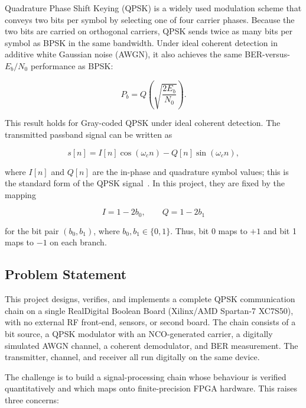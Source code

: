 \documentclass[10pt,twocolumn,letterpaper]{article}
\begin{document}
Quadrature Phase Shift Keying (QPSK) is a widely used modulation scheme that conveys two bits per symbol by selecting one of four carrier phases. Because the two bits are carried on orthogonal carriers, QPSK sends twice as many bits per symbol as BPSK in the same bandwidth. Under ideal coherent detection in additive white Gaussian noise (AWGN), it also achieves the same BER-versus-$E_b/N_0$ performance as BPSK:

\begin{equation}
P_b = Q\left(\sqrt{\frac{2E_b}{N_0}}\right).
\label{eq:qpsk_ber}
\end{equation}

This result holds for Gray-coded QPSK under ideal coherent detection. The transmitted passband signal can be written as

\begin{equation}
s[n] = I[n]\cos(\omega_c n) - Q[n]\sin(\omega_c n),
\label{eq:qpsk_signal}
\end{equation}

where $I[n]$ and $Q[n]$ are the in-phase and quadrature symbol values; this is the standard form of the QPSK signal~\cite{nptel_qpsk}. In this project, they are fixed by the mapping

\begin{equation}
I = 1 - 2b_0, \qquad Q = 1 - 2b_1
\label{eq:qpsk_mapping}
\end{equation}

for the bit pair $(b_0,b_1)$, where $b_0,b_1\in\{0,1\}$. Thus, bit 0 maps to $+1$ and bit 1 maps to $-1$ on each branch.

\subsection{Problem Statement}

This project designs, verifies, and implements a complete QPSK communication chain on a single RealDigital Boolean Board (Xilinx/AMD Spartan-7 XC7S50), with no external RF front-end, sensors, or second board. The chain consists of a bit source, a QPSK modulator with an NCO-generated carrier, a digitally simulated AWGN channel, a coherent demodulator, and BER measurement. The transmitter, channel, and receiver all run digitally on the same device.

The challenge is to build a signal-processing chain whose behaviour is verified quantitatively and which maps onto finite-precision FPGA hardware. This raises three concerns:
\end{document}
